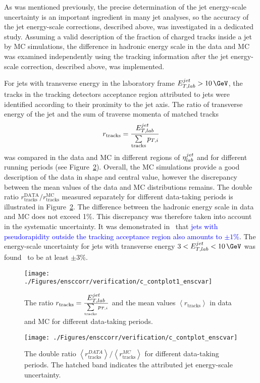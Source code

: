 As  was mentioned previously, the precise determination of the jet energy-scale uncertainty is an important ingredient in many jet analyses, so the accuracy of the jet energy-scale corrections, described above, was investigated in a dedicated study. Assuming a valid description of the fraction of charged tracks inside a jet by MC simulations, the difference in hadronic energy scale in the data and MC was examined independently using the tracking information after the jet energy-scale correction, described above, was implemented. 

For jets with transverse energy in the laboratory frame $\etjetlab > 10\,\GeV$, the tracks in the tracking detectors acceptance region attributed to jets were identified according to their proximity to the jet axis. The ratio of transverse energy of the jet and the sum of traverse momenta of matched tracks 
\begin{equation}
r_\text{tracks} = \frac{\mbox{$E_{T,lab}^{jet}$}}{\sum\limits_{\text{tracks}}{p_{T,i}}}
\end{equation}
was compared in the data and MC in different regions of $\mbox{$\eta^{jet}_{lab}$}$ and for different running periods (see Figure~\ref{fig:ratcalibcontrolplotunc1}). Overall, the MC simulations provide a good description of the data in shape and central value, however the discrepancy between the mean values of the data and MC distributions remains. The double ratio $r_\text{tracks}^\text{DATA}/r_\text{tracks}^\text{MC}$ measured separately for different data-taking periods is illustrated in Figure~\ref{fig:ratcalibcontrolplotunc1}. The difference between the hadronic energy scale in data and MC does not exceed 1\%. This discrepancy was therefore taken into account in the systematic uncertainty. It was demonstrated in~\cite{joerg,phpjetspresentationunpublished} that \textcolor{blue}{jets with pseudorapidity outside the tracking acceptance region also amounts to $\pm 1\%$}. The energy-scale uncertainty for jets with transverse energy $3<\etjetlab<10\,\GeV$ was found~\cite{joerg} to be at least $\pm 3\%$.
\begin{figure}[h!]
	\centering
		\texttt{[image: ./Figures/ensccorr/verification/c\_contplot1\_enscvar]} 
	\caption{The ratio $r_\text{tracks} = \frac{\mbox{$E_{T,lab}^{jet}$}}{\sum\limits_{\text{tracks}}{p_{T,i}}}$ and the mean values $\left\langle r_\text{tracks}\right\rangle$ in data and MC for different data-taking periods.}
	\label{fig:ratcalibcontrolplotunc}
\end{figure}

\begin{figure}[ht]
	\centering
		\texttt{[image: ./Figures/ensccorr/verification/c\_contplot\_enscvar]} 
	\caption{The double ratio $\left\langle r^{DATA}_\text{tracks}\right\rangle/\left\langle r^{MC}_\text{tracks}\right\rangle$ for different data-taking periods. The hatched band indicates the attributed jet energy-scale uncertainty.}
	\label{fig:ratcalibcontrolplotunc1}
\end{figure}
